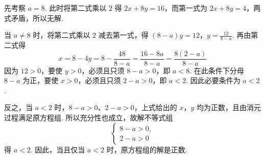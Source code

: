 \begin{solution}
先考察 \(a=8\). 此时将第二式乘以 \(2\) 得 \(2x+8y=16\)，而第一式为 \(2x+8y=4\)，两式矛盾，所以无解.

当 \(a\neq8\) 时，将第二式乘以 \(2\) 减去第一式，得
\((8-a)y=12\)，\(y=\frac{12}{8-a}\).
再由第二式得
\[
x=8-4y=8-\frac{48}{8-a}=\frac{16-8a}{8-a}=\frac{8(2-a)}{8-a}
\]
因为 \(12>0\)，要使 \(y>0\)，必须且只须 \(8-a>0\)，即 \(a<8\). 在此条件下分母 \(8-a\) 为正，要使 \(x>0\)，必须且只须 \(2-a>0\)，即 \(a<2\). 因此必要条件为 \(a<2\).

反之，当 \(a<2\) 时，\(8-a>0\)、\(2-a>0\)，上式给出的 \(x\)，\(y\) 均为正数，且由消元过程满足原方程组. 所以充分性也成立，故解不等式组
\[
\begin{cases}
8-a>0,\\
2-a>0
\end{cases}
\]
得 \(a<2\). 因此，当且仅当 \(a<2\) 时，原方程组的解是正数.
\end{solution}
